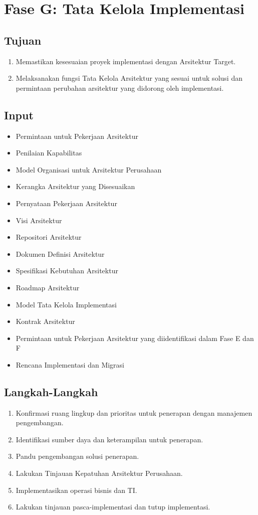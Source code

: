 \chapter{Fase G: Tata Kelola Implementasi}

\section{Tujuan}
\begin{enumerate}
	\item Memastikan kesesuaian proyek implementasi dengan Arsitektur Target.
	\item Melaksanakan fungsi Tata Kelola Arsitektur yang sesuai untuk solusi dan permintaan perubahan arsitektur yang didorong oleh implementasi.
\end{enumerate}

\section{Input}
\begin{itemize}
	\item Permintaan untuk Pekerjaan Arsitektur
	\item Penilaian Kapabilitas
	\item Model Organisasi untuk Arsitektur Perusahaan
	\item Kerangka Arsitektur yang Disesuaikan
	\item Pernyataan Pekerjaan Arsitektur
	\item Visi Arsitektur
	\item Repositori Arsitektur
	\item Dokumen Definisi Arsitektur
	\item Spesifikasi Kebutuhan Arsitektur
	\item Roadmap Arsitektur
	\item Model Tata Kelola Implementasi
	\item Kontrak Arsitektur
	\item Permintaan untuk Pekerjaan Arsitektur yang diidentifikasi dalam Fase E dan F
	\item Rencana Implementasi dan Migrasi
\end{itemize}

\section{Langkah-Langkah}
\begin{enumerate}
	\item Konfirmasi ruang lingkup dan prioritas untuk penerapan dengan manajemen pengembangan.
	\item Identifikasi sumber daya dan keterampilan untuk penerapan.
	\item Pandu pengembangan solusi penerapan.
	\item Lakukan Tinjauan Kepatuhan Arsitektur Perusahaan.
	\item Implementasikan operasi bisnis dan TI.
	\item Lakukan tinjauan pasca-implementasi dan tutup implementasi.
\end{enumerate}


